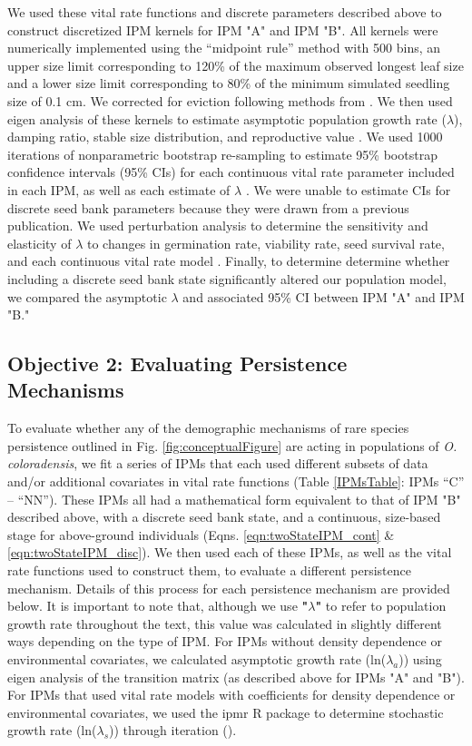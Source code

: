\documentclass[12pt, letterpaper]{article}
\begin{document}
We used these vital rate functions and discrete parameters described above to construct discretized IPM kernels for IPM "A" and IPM "B". All kernels were numerically implemented using the “midpoint rule” method \cite{Easterling2000} with 500 bins, an upper size limit corresponding to 120\% of the maximum observed longest leaf size and a lower size limit corresponding to 80\% of the minimum simulated seedling size of 0.1 cm. We corrected for eviction following methods from \cite{Williams2012-xs}. We then used eigen analysis of these kernels to estimate asymptotic population growth rate ($\lambda$), damping ratio, stable size distribution, and reproductive value \cite{Caswell2001MatrixInterpretation, Ellner2016Data-drivenPopulations}. We used 1000 iterations of nonparametric bootstrap re-sampling to estimate 95\% bootstrap confidence intervals (95\% CIs) for each continuous vital rate parameter included in each IPM, as well as each estimate of $\lambda$ \cite{Merow2014AdvancingGuide, Fieberg2020Resampling-basedBiologists}. We were unable to estimate CIs for discrete seed bank parameters because they were drawn from a previous publication. We used perturbation analysis to determine the sensitivity and elasticity of $\lambda$ to changes in germination rate, viability rate, seed survival rate, and each continuous vital rate model \cite{Morris2002QuantitativeAnalysis}. Finally, to determine determine whether including a discrete seed bank state significantly altered our population model, we compared the asymptotic $\lambda$ and associated 95\% CI between IPM "A" and IPM "B." 

\subsection{Objective 2: Evaluating Persistence Mechanisms}
To evaluate whether any of the demographic mechanisms of rare species persistence outlined in Fig. \ref{fig:conceptualFigure} are acting in populations of \textit{O. coloradensis}, we fit a series of IPMs that each used different subsets of data and/or additional covariates in vital rate functions (Table \ref{IPMsTable}: IPMs “C” – “NN”). These IPMs all had a mathematical form equivalent to that of IPM "B" described above, with a discrete seed bank state, and a continuous, size-based stage for above-ground individuals (Eqns. \ref{eqn:twoStateIPM_cont} \& \ref{eqn:twoStateIPM_disc}). We then used each of these IPMs, as well as the vital rate functions used to construct them, to evaluate a different persistence mechanism. Details of this process for each persistence mechanism are provided below. It is important to note that, although we use \textbf{"$\lambda$"} to refer to population growth rate throughout the text, this value was calculated in slightly different ways depending on the type of IPM. For IPMs without density dependence or environmental covariates, we calculated asymptotic growth rate (ln($\lambda_a$)) using eigen analysis of the transition matrix (as described above for IPMs "A" and "B"). For IPMs that used vital rate models with coefficients for density dependence or environmental covariates, we used the ipmr R package to determine stochastic growth rate (ln($\lambda_s$)) through iteration (\cite{Levin2021Ipmr:R}). 
\end{document}
